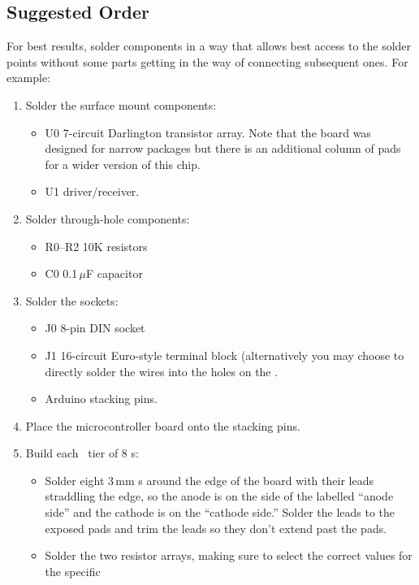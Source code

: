 \subsection{Suggested Order}
For best results, solder components in a way that allows best access to the
solder points without some parts getting in the way of connecting subsequent ones. For example:
\begin{enumerate}
	\item Solder the surface mount components:
		\begin{itemize}
			\item U0  7-circuit  Darlington transistor array.
				Note that the board was designed for narrow  packages but
				there is an additional column of pads for a wider version of this chip.
			\item U1   driver/receiver.
		\end{itemize}
	\item Solder through-hole components:
		\begin{itemize}
			\item R0--R2 10K resistors
			\item C0 0.1\,$\mu$F capacitor
		\end{itemize}
	\item Solder the sockets:
		\begin{itemize}
			\item J0 8-pin DIN socket
			\item J1 16-circuit Euro-style terminal block (alternatively you may choose to
				directly solder the  wires into the holes on the .
			\item Arduino stacking pins.
		\end{itemize}
	\item Place the microcontroller board onto the stacking pins.
	\item Build each \led\ tier of 8 \led s:
		\begin{itemize}
			\item Solder eight 3\,mm \led s around the edge of the board with their leads straddling
				the edge, so the anode is on the side of the  labelled ``anode side'' and the
				cathode is on the ``cathode side.'' Solder the leads to the exposed pads and trim the
				leads so they don't extend past the pads.
			\item Solder the two resistor arrays, making sure to select the correct values for the specific

\end{itemize}
\end{enumerate}
